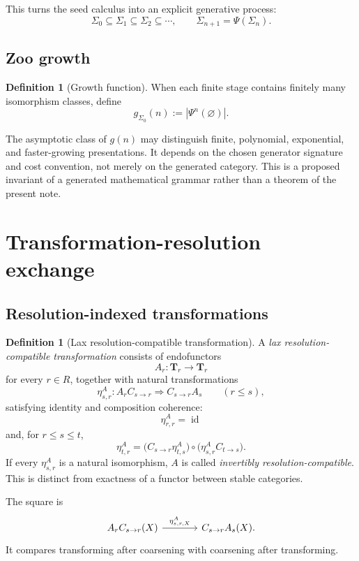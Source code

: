 \documentclass[11pt]{article}
\theoremstyle{definition}
\newtheorem{definition}[theorem]{Definition}
\theoremstyle{remark}
\newcommand{\Tcat}{\mathbf T}
\newcommand{\Seeds}{\Sigma}
\newcommand{\id}{\operatorname{id}}
\begin{document}
This turns the seed calculus into an explicit generative process:
\[
\Seeds_0
\subseteq
\Seeds_1
\subseteq
\Seeds_2
\subseteq\cdots,
\qquad
\Seeds_{n+1}=\Psi(\Seeds_n).
\]

\subsection{Zoo growth}

\begin{definition}[Growth function]
When each finite stage contains finitely many isomorphism classes, define
\[
g_{\Seeds_0}(n):=|\Psi^n(\varnothing)|.
\]
\end{definition}

The asymptotic class of $g(n)$ may distinguish finite, polynomial, exponential, and faster-growing presentations. It depends on the chosen generator signature and cost convention, not merely on the generated category. This is a proposed invariant of a generated mathematical grammar rather than a theorem of the present note.

\section{Transformation-resolution exchange}

\subsection{Resolution-indexed transformations}

\begin{definition}[Lax resolution-compatible transformation]\label{def:laxtrans}
A \emph{lax resolution-compatible transformation} consists of endofunctors
\[
A_r:\Tcat_r\to\Tcat_r
\]
for every $r\in R$, together with natural transformations
\[
\eta^A_{s,r}:
A_rC_{s\to r}
\Longrightarrow
C_{s\to r}A_s
\qquad(r\le s),
\]
satisfying identity and composition coherence:
\[
\eta^A_{r,r}=\id
\]
and, for $r\le s\le t$,
\[
\eta^A_{t,r}
=
\bigl(C_{s\to r}\eta^A_{t,s}\bigr)
\circ
\bigl(\eta^A_{s,r}C_{t\to s}\bigr).
\]
If every $\eta^A_{s,r}$ is a natural isomorphism, $A$ is called \emph{invertibly resolution-compatible}. This is distinct from exactness of a functor between stable categories.
\end{definition}

The square is
\[
\begin{tikzcd}[column sep=large,row sep=large]
A_rC_{s\to r}(X) \arrow[r,"\eta^A_{s,r,X}"] & C_{s\to r}A_s(X).
\end{tikzcd}
\]
It compares transforming after coarsening with coarsening after transforming.
\end{document}
